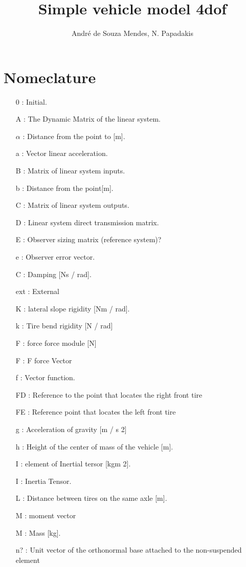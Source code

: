 \documentclass[sublist,a4paper,twoside,11pt]{article}
\author{André de Souza Mendes, N. Papadakis}
\title{Simple vehicle model 4dof }
\begin{document}
\maketitle
\tableofcontents
\section*{Nomeclature}

\begin{itemize}
\item [0]: Initial.
\item [A]: The Dynamic Matrix of the linear system.
\item [$\alpha$]: Distance from the point to [m].
\item [a]: Vector linear acceleration.
\item [B]: Matrix of linear system inputs.
\item [b]: Distance from the point[m].
\item [C]: Matrix of linear system outputs.
\item [D]: Linear system direct transmission matrix.
\item [E]: Observer sizing matrix (reference system)?
\item [e]: Observer error vector.
\item [C]: Damping [Ns / rad].
\item [ext]: External
\item [K]: lateral slope rigidity [Nm / rad].
\item [k]: Tire bend rigidity [N / rad]
\item [F]: force force module [N]
\item [F]: F force Vector
\item [f ]: Vector function.
\item [FD]: Reference to the point that locates the right front tire
\item [FE]: Reference point that locates the left front tire
\item [g]: Acceleration of gravity [m / s 2]
\item [h]: Height of the center of mass of the vehicle [m].
\item [I]: element of Inertial tersor [kgm 2].
\item [I]: Inertia Tensor.
\item [L]: Distance between tires on the same axle [m].
\item [M]: moment vector 
\item [M]: Mass [kg].
\item [n?]: Unit vector of the orthonormal base attached to the non-suspended element

\end{itemize}
\end{document}
